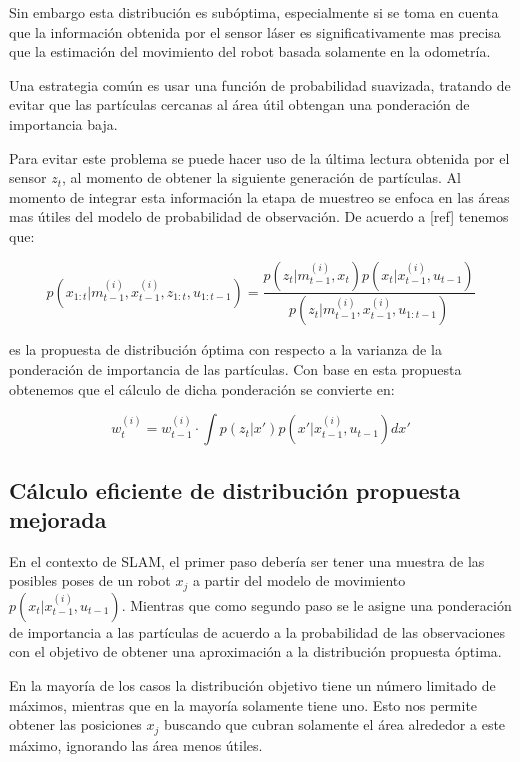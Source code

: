 \documentclass[10pt,a4paper]{article}
\begin{document}
Sin embargo esta distribución es subóptima, especialmente si se toma en cuenta que la información obtenida por el sensor láser es significativamente mas precisa que la estimación del movimiento del robot basada solamente en la odometría. 

Una estrategia común es usar una función de probabilidad suavizada, tratando de evitar que las partículas cercanas al área útil obtengan una ponderación de importancia baja.

Para evitar este problema se puede hacer uso de la última lectura obtenida por el sensor $ z_{t} $, al momento de obtener la siguiente generación de partículas. Al momento de integrar esta información la etapa de muestreo se enfoca en las áreas mas útiles del modelo de probabilidad de observación. De acuerdo a [ref] tenemos que:

	\begin{equation}
		p(x_{1:t} | m_{t-1}^{(i)}, x_{t-1}^{(i)}, z_{1:t},u_{1:t-1}) =
			\frac{p(z_{t} | m_{t-1}^{(i)}, x_{t}) p(x_{t} | x_{t-1}^{(i)}, u_{t-1}) }
			{p(z_{t} | m_{t-1}^{(i)}, x_{t-1}^{(i)}, u_{1:t-1})}
	\end{equation}

es la propuesta de distribución óptima con respecto a la varianza de la ponderación de importancia de las partículas. Con base en esta propuesta obtenemos que el cálculo de dicha ponderación se convierte en:

	\begin{equation}
		w_{t}^{(i)} = 
			w_{t-1}^{(i)} \cdot \int p(z_{t}|x') p(x' | x_{t-1}^{(i)}, u_{t-1})dx'
	\end{equation}
	
\subsection{Cálculo eficiente de distribución propuesta mejorada}

En el contexto de SLAM, el primer paso debería ser tener una muestra de las posibles poses de un robot $ x_{j} $ a partir del modelo de movimiento $ p(x_{t} | x_{t-1}^{(i)}, u_{t-1}) $. Mientras que como segundo paso se le asigne una ponderación de importancia a las partículas de acuerdo a la probabilidad de las observaciones con el objetivo de obtener una aproximación a la distribución propuesta óptima.

En la mayoría de los casos la distribución objetivo tiene un número limitado de máximos, mientras que en la mayoría solamente tiene uno. Esto nos permite obtener las posiciones $ x_{j} $ buscando que cubran solamente el área alrededor a este máximo, ignorando las área menos útiles.
\end{document}
